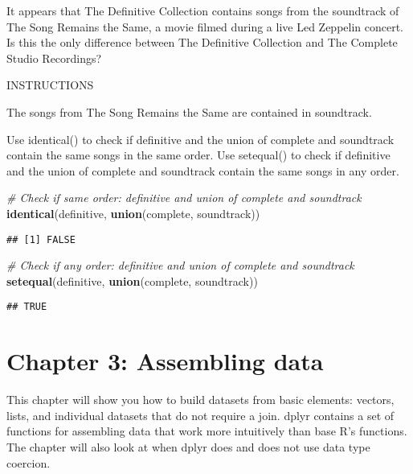 \documentclass[]{article}
\newenvironment{Shaded}{\begin{snugshade}}{\end{snugshade}}
\newcommand{\KeywordTok}[1]{\textcolor[rgb]{0.13,0.29,0.53}{\textbf{#1}}}
\newcommand{\CommentTok}[1]{\textcolor[rgb]{0.56,0.35,0.01}{\textit{#1}}}
\newcommand{\NormalTok}[1]{#1}
\begin{document}
It appears that The Definitive Collection contains songs from the
soundtrack of The Song Remains the Same, a movie filmed during a live
Led Zeppelin concert. Is this the only difference between The Definitive
Collection and The Complete Studio Recordings?

INSTRUCTIONS

The songs from The Song Remains the Same are contained in soundtrack.

Use identical() to check if definitive and the union of complete and
soundtrack contain the same songs in the same order. Use setequal() to
check if definitive and the union of complete and soundtrack contain the
same songs in any order.

\begin{Shaded}
\begin{Highlighting}[]
\CommentTok{# Check if same order: definitive and union of complete and soundtrack}
\KeywordTok{identical}\NormalTok{(definitive, }\KeywordTok{union}\NormalTok{(complete, soundtrack))}
\end{Highlighting}
\end{Shaded}

\begin{verbatim}
## [1] FALSE
\end{verbatim}

\begin{Shaded}
\begin{Highlighting}[]
\CommentTok{# Check if any order: definitive and union of complete and soundtrack}
\KeywordTok{setequal}\NormalTok{(definitive, }\KeywordTok{union}\NormalTok{(complete, soundtrack))}
\end{Highlighting}
\end{Shaded}

\begin{verbatim}
## TRUE
\end{verbatim}

\section{Chapter 3: Assembling data}\label{chapter-3-assembling-data}

This chapter will show you how to build datasets from basic elements:
vectors, lists, and individual datasets that do not require a join.
dplyr contains a set of functions for assembling data that work more
intuitively than base R's functions. The chapter will also look at when
dplyr does and does not use data type coercion.
\end{document}
